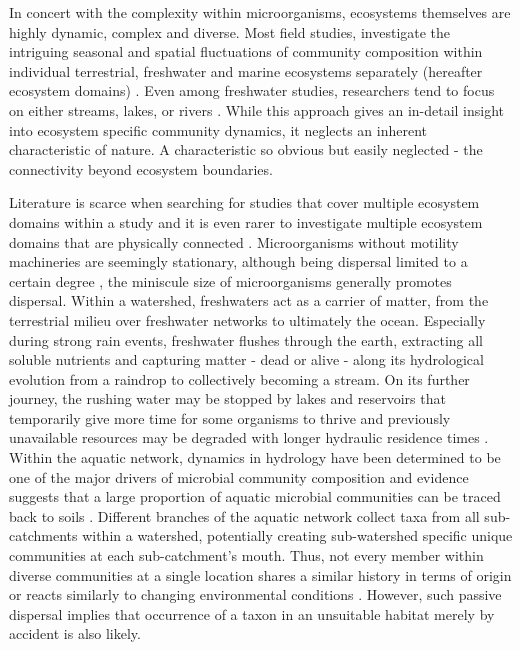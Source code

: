 \documentclass[12pt,a4paper]{article} %
\begin{document}
In concert with the complexity within microorganisms, ecosystems themselves are highly dynamic, complex and diverse. Most field studies, investigate the intriguing seasonal and spatial fluctuations of community composition within individual terrestrial, freshwater and marine ecosystems separately (hereafter ecosystem domains) \citep{Shigyo2019,Jones2012,Hassell2018,Giovannoni2012}. Even among freshwater studies, researchers tend to focus on either streams, lakes, or rivers \citep{Logue2008}. While this approach gives an in-detail insight into ecosystem specific community dynamics, it neglects an inherent characteristic of nature. A characteristic so obvious but easily neglected - the connectivity beyond ecosystem boundaries.

Literature is scarce when searching for studies that cover multiple ecosystem domains within a study \citep{Nemergut2011, Shade2013} and it is even rarer to investigate multiple ecosystem domains that are physically connected \citep{Ruiz-Gonzalez2015, Hauptmann2016, Doherty2017, Gweon2020}. Microorganisms without motility machineries are seemingly stationary, although being dispersal limited to a certain degree \citep{Hanson2012}, the miniscule size of microorganisms generally promotes dispersal. Within a watershed, freshwaters act as a carrier of matter, from the terrestrial milieu over freshwater networks to ultimately the ocean. Especially during strong rain events, freshwater flushes through the earth, extracting all soluble nutrients and capturing matter - dead or alive - along its hydrological evolution from a raindrop to collectively becoming a stream. On its further journey, the rushing water may be stopped by lakes and reservoirs that temporarily give more time for some organisms to thrive and previously unavailable resources may be degraded with longer hydraulic residence times \citep{Catalan2016a}. Within the aquatic network, dynamics in hydrology have been determined to be one of the major drivers of microbial community composition \citep{Nino-Garcia2016} and evidence suggests that a large proportion of aquatic microbial communities can be traced back to soils \citep{Crump2012, Besemer2013, Ruiz-Gonzalez2015, Hauptmann2016}. Different branches of the aquatic network collect taxa from all sub-catchments within a watershed, potentially creating sub-watershed specific unique communities at each sub-catchment's mouth. Thus, not every member within diverse communities at a single location shares a similar history in terms of origin \citep{Nino-Garcia2016, Comte2017} or reacts similarly to changing environmental conditions \citep{Fierer2007}. However, such passive dispersal implies that occurrence of a taxon in an unsuitable habitat merely by accident is also likely.
\end{document}

